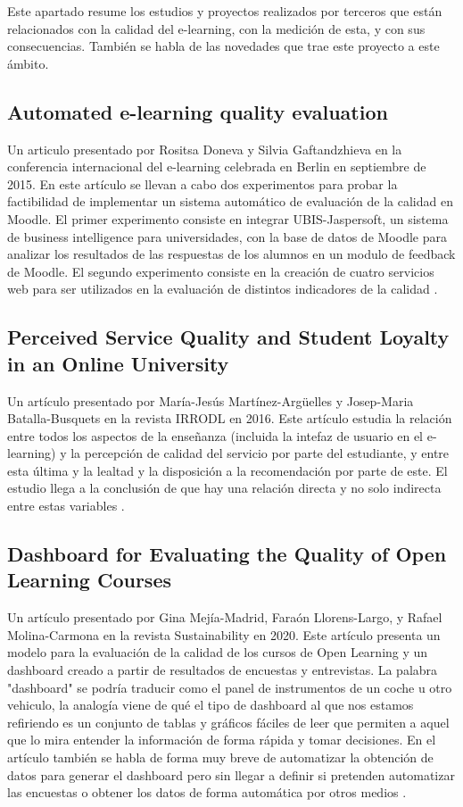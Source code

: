 
Este apartado resume los estudios y proyectos realizados por terceros que están relacionados con la calidad del e-learning, con la medición de esta, y con sus consecuencias. También se habla de las novedades que trae este proyecto a este ámbito.

\subsection{Automated e-learning quality evaluation}
Un articulo presentado por Rositsa Doneva y Silvia Gaftandzhieva en la conferencia internacional del e-learning celebrada en Berlin en septiembre de 2015.
En este artículo se llevan a cabo dos experimentos para probar la factibilidad de implementar un sistema automático de evaluación de la calidad en Moodle. El primer experimento consiste en integrar UBIS-Jaspersoft, un sistema de business intelligence para universidades, con la base de datos de Moodle para analizar los resultados de las respuestas de los alumnos en un modulo de feedback de Moodle. El segundo experimento consiste en la creación de cuatro servicios web para ser utilizados en la evaluación de distintos indicadores de la calidad \cite{doneva2015automated}.

\subsection{Perceived Service Quality and Student Loyalty in an Online University}
Un artículo presentado por María-Jesús Martínez-Argüelles y Josep-Maria Batalla-Busquets en la revista IRRODL en 2016.
Este artículo estudia la relación entre todos los aspectos de la enseñanza (incluida la intefaz de usuario en el e-learning) y la percepción de calidad del servicio por parte del estudiante, y entre esta última y la lealtad y la disposición a la recomendación por parte de este. El estudio llega a la conclusión de que hay una relación directa y no solo indirecta entre estas variables \cite{martinez2016perceived}.

\subsection{Dashboard for Evaluating the Quality of Open Learning Courses}
Un artículo presentado por Gina Mejía-Madrid, Faraón Llorens-Largo, y Rafael Molina-Carmona en la revista Sustainability en 2020.
Este artículo presenta un modelo para la evaluación de la calidad de los cursos de Open Learning y un dashboard creado a partir de resultados de encuestas y entrevistas. La palabra "dashboard" se podría traducir como el panel de instrumentos de un coche u otro vehiculo, la analogía viene de qué el tipo de dashboard al que nos estamos refiriendo es un conjunto de tablas y gráficos fáciles de leer que permiten a aquel que lo mira entender la información de forma rápida y tomar decisiones. En el artículo también se habla de forma muy breve de automatizar la obtención de datos para generar el dashboard pero sin llegar a definir si pretenden automatizar las encuestas o obtener los datos de forma automática por otros medios \cite{mejia2020dashboard}.

